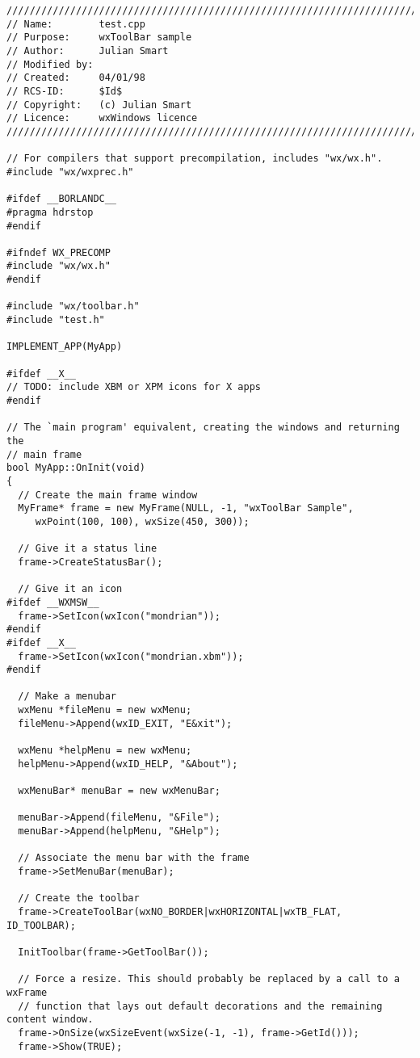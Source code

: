 {\small
\begin{verbatim}
/////////////////////////////////////////////////////////////////////////////
// Name:        test.cpp
// Purpose:     wxToolBar sample
// Author:      Julian Smart
// Modified by:
// Created:     04/01/98
// RCS-ID:      $Id$
// Copyright:   (c) Julian Smart
// Licence:   	wxWindows licence
/////////////////////////////////////////////////////////////////////////////

// For compilers that support precompilation, includes "wx/wx.h".
#include "wx/wxprec.h"

#ifdef __BORLANDC__
#pragma hdrstop
#endif

#ifndef WX_PRECOMP
#include "wx/wx.h"
#endif

#include "wx/toolbar.h"
#include "test.h"

IMPLEMENT_APP(MyApp)

#ifdef __X__
// TODO: include XBM or XPM icons for X apps
#endif

// The `main program' equivalent, creating the windows and returning the
// main frame
bool MyApp::OnInit(void)
{
  // Create the main frame window
  MyFrame* frame = new MyFrame(NULL, -1, "wxToolBar Sample",
     wxPoint(100, 100), wxSize(450, 300));

  // Give it a status line
  frame->CreateStatusBar();

  // Give it an icon
#ifdef __WXMSW__
  frame->SetIcon(wxIcon("mondrian"));
#endif
#ifdef __X__
  frame->SetIcon(wxIcon("mondrian.xbm"));
#endif

  // Make a menubar
  wxMenu *fileMenu = new wxMenu;
  fileMenu->Append(wxID_EXIT, "E&xit");

  wxMenu *helpMenu = new wxMenu;
  helpMenu->Append(wxID_HELP, "&About");

  wxMenuBar* menuBar = new wxMenuBar;

  menuBar->Append(fileMenu, "&File");
  menuBar->Append(helpMenu, "&Help");

  // Associate the menu bar with the frame
  frame->SetMenuBar(menuBar);

  // Create the toolbar
  frame->CreateToolBar(wxNO_BORDER|wxHORIZONTAL|wxTB_FLAT, ID_TOOLBAR);

  InitToolbar(frame->GetToolBar());

  // Force a resize. This should probably be replaced by a call to a wxFrame
  // function that lays out default decorations and the remaining content window.
  frame->OnSize(wxSizeEvent(wxSize(-1, -1), frame->GetId()));
  frame->Show(TRUE);


\end{verbatim}}
